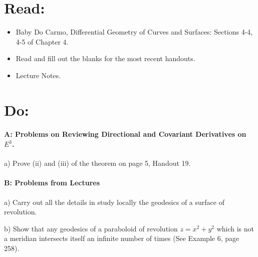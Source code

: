 \documentclass[12pt]{article}
\title{\rightline {\Huge {Due: Monday, December 4}}}
\author{\LARGE {HMC\quad Math 142 \quad Fall 2023} 
\\ {Prof. Gu}  
\\ {\LARGE Problem Set 11}}
\date{Start this assignment early!}
\begin{document}
\maketitle

\section*{ Read: } 

\begin{itemize}
\item{Baby Do Carmo, Differential Geometry
    of Curves and Surfaces:  
Sections 4-4, 4-5 of Chapter 4.}
\item{ Read and fill out the blanks for the most recent handouts.}
\item{Lecture Notes.}
\end{itemize}

\section*{ Do: }
\paragraph{A: Problems on Reviewing Directional and Covariant
Derivatives on $E^3$.}

\begin{itemize}
{\item a) Prove (ii) and (iii) of the theorem on page 5, Handout 19.} 
\end{itemize}

\medskip
\paragraph{B: Problems from Lectures}

\begin{itemize}
{\item a) Carry out all the details in study locally the geodesics 
of a surface of revolution.} 
{\item b) Show that any geodesics of a paraboloid of revolution 
$z = x^2 + y^2$ which is not a meridian intersects itself an infinite 
number of times (See Example 6, page 258).}   
\end{itemize}
\end{document}
